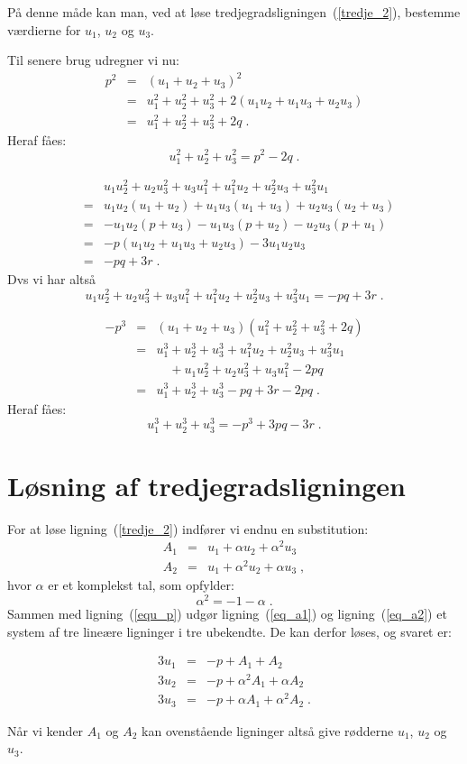 \documentclass[12pt,oneside,a4paper]{article}
\newcommand{\bas}{\begin{eqnarray*}}
\newcommand{\eas}{\end{eqnarray*}}
\newcommand{\bea}{\begin{eqnarray}}
\newcommand{\eea}{\end{eqnarray}}
\begin{document}
På denne måde kan man, ved at løse tredjegradsligningen~(\ref{tredje_2}),
bestemme værdierne for $u_1$, $u_2$ og $u_3$.

Til senere brug udregner vi nu:
\bas
p^2 &=& (u_1 + u_2 + u_3)^2 \\
&=& u_1^2 + u_2^2 + u_3^2 + 2(u_1u_2 + u_1u_3 + u_2u_3) \\
&=& u_1^2 + u_2^2 + u_3^2 + 2q \;.
\eas
Heraf fåes:
\begin{equation}
u_1^2 + u_2^2 + u_3^2 = p^2 - 2q\;.
\end{equation}

\bas
&& u_1u_2^2 + u_2u_3^2 + u_3u_1^2 + u_1^2u_2 + u_2^2u_3 + u_3^2u_1 \\
&=& u_1u_2(u_1+u_2) + u_1u_3(u_1+u_3) + u_2u_3(u_2+u_3) \\
&=& -u_1u_2(p+u_3) - u_1u_3(p+u_2) - u_2u_3(p+u_1) \\
&=& -p(u_1u_2 + u_1u_3 + u_2u_3) - 3u_1u_2u_3 \\
&=& -pq + 3r \;.
\eas
Dvs vi har altså
\begin{equation}
u_1u_2^2 + u_2u_3^2 + u_3u_1^2 + u_1^2u_2 + u_2^2u_3 + u_3^2u_1 
= -pq + 3r \;.
\label{eq_u1_u22}
\end{equation}

\bas
-p^3 &=& (u_1+u_2+u_3)(u_1^2+u_2^2+u_3^2 + 2q) \\
&=& u_1^3 + u_2^3 + u_3^3 + u_1^2u_2 + u_2^2u_3 + u_3^2u_1 \\
&& \quad + u_1u_2^2 + u_2u_3^2 + u_3u_1^2 - 2pq \\
&=& u_1^3 + u_2^3 + u_3^3 - pq+3r - 2pq \;.
\eas
Heraf fåes:
\begin{equation}
u_1^3 + u_2^3 + u_3^3 = -p^3 + 3pq - 3r \;.
\end{equation}

\section{Løsning af tredjegradsligningen}
For at løse ligning~(\ref{tredje_2}) indfører vi endnu en substitution:
\bea
A_1 &=& u_1 + \alpha u_2 + \alpha^2 u_3 \label{eq_a1}\\
A_2 &=& u_1 + \alpha^2 u_2 + \alpha u_3  \label{eq_a2}\;,
\eea
hvor $\alpha$ er et komplekst tal, som opfylder:
\begin{equation}
\alpha^2 = -1 - \alpha \;.
\end{equation}
Sammen med ligning~(\ref{equ_p}) udgør ligning~(\ref{eq_a1}) og
ligning~(\ref{eq_a2}) et system af tre lineære ligninger i tre ubekendte.
De kan derfor løses, og svaret er:
\begin{tcolorbox}
\bea
3u_1 &=& -p + A_1 + A_2 \label{eq_u1}\\
3u_2 &=& -p + \alpha^2 A_1 + \alpha A_2 \label{eq_u2}\\
3u_3 &=& -p + \alpha A_1 + \alpha^2 A_2 \label{eq_u3}\;.
\eea
\end{tcolorbox}
Når vi kender $A_1$ og $A_2$ kan ovenstående ligninger altså give rødderne
$u_1$, $u_2$ og $u_3$.
\end{document}
